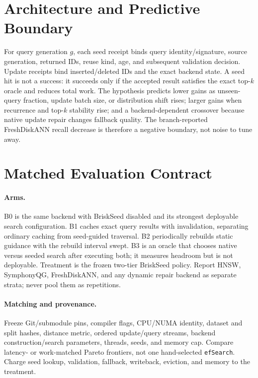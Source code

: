 \documentclass[10pt]{article}
\begin{document}
\section{Architecture and Predictive Boundary}
For query generation $g$, each seed receipt binds query identity/signature, source generation, returned IDs, reuse kind, age, and subsequent validation decision.  Update receipts bind inserted/deleted IDs and the exact backend state.  A seed hit is not a success: it succeeds only if the accepted result satisfies the exact top-$k$ oracle and reduces total work.  The hypothesis predicts lower gains as unseen-query fraction, update batch size, or distribution shift rises; larger gains when recurrence and top-$k$ stability rise; and a backend-dependent crossover because native update repair changes fallback quality.  The branch-reported FreshDiskANN recall decrease is therefore a negative boundary, not noise to tune away.

\section{Matched Evaluation Contract}\label{sec:eval}
\paragraph{Arms.} B0 is the same backend with BriskSeed disabled and its strongest deployable search configuration.  B1 caches exact query results with invalidation, separating ordinary caching from seed-guided traversal.  B2 periodically rebuilds static guidance with the rebuild interval swept.  B3 is an oracle that chooses native versus seeded search after executing both; it measures headroom but is not deployable.  Treatment is the frozen two-tier BriskSeed policy.  Report HNSW, SymphonyQG, FreshDiskANN, and any dynamic repair backend as separate strata; never pool them as repetitions.

\paragraph{Matching and provenance.} Freeze Git/submodule pins, compiler flags, CPU/NUMA identity, dataset and split hashes, distance metric, ordered update/query streams, backend construction/search parameters, threads, seeds, and memory cap.  Compare latency- or work-matched Pareto frontiers, not one hand-selected \texttt{efSearch}.  Charge seed lookup, validation, fallback, writeback, eviction, and memory to the treatment.
\end{document}
